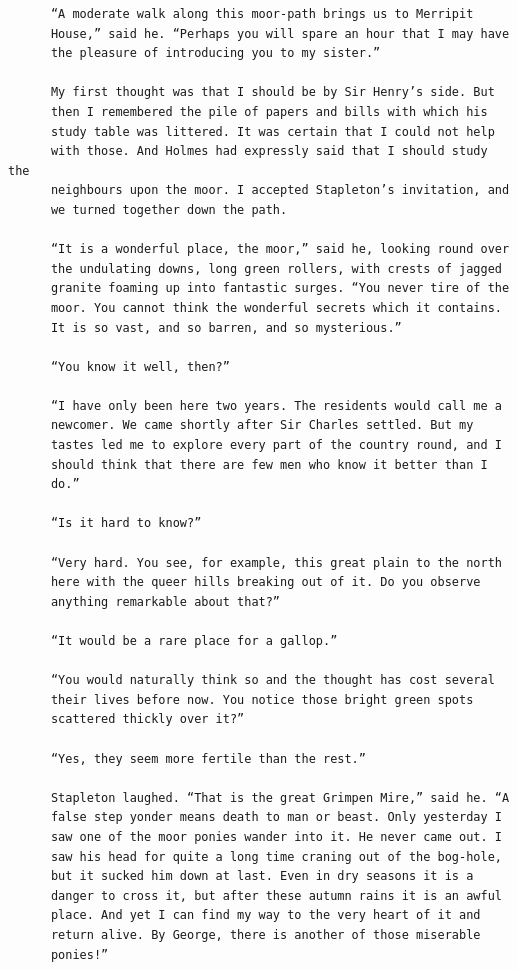 \documentclass{article}
\begin{document}
\begin{verbatim}
      “A moderate walk along this moor-path brings us to Merripit
      House,” said he. “Perhaps you will spare an hour that I may have
      the pleasure of introducing you to my sister.”

      My first thought was that I should be by Sir Henry’s side. But
      then I remembered the pile of papers and bills with which his
      study table was littered. It was certain that I could not help
      with those. And Holmes had expressly said that I should study the
      neighbours upon the moor. I accepted Stapleton’s invitation, and
      we turned together down the path.

      “It is a wonderful place, the moor,” said he, looking round over
      the undulating downs, long green rollers, with crests of jagged
      granite foaming up into fantastic surges. “You never tire of the
      moor. You cannot think the wonderful secrets which it contains.
      It is so vast, and so barren, and so mysterious.”

      “You know it well, then?”

      “I have only been here two years. The residents would call me a
      newcomer. We came shortly after Sir Charles settled. But my
      tastes led me to explore every part of the country round, and I
      should think that there are few men who know it better than I
      do.”

      “Is it hard to know?”

      “Very hard. You see, for example, this great plain to the north
      here with the queer hills breaking out of it. Do you observe
      anything remarkable about that?”

      “It would be a rare place for a gallop.”

      “You would naturally think so and the thought has cost several
      their lives before now. You notice those bright green spots
      scattered thickly over it?”

      “Yes, they seem more fertile than the rest.”

      Stapleton laughed. “That is the great Grimpen Mire,” said he. “A
      false step yonder means death to man or beast. Only yesterday I
      saw one of the moor ponies wander into it. He never came out. I
      saw his head for quite a long time craning out of the bog-hole,
      but it sucked him down at last. Even in dry seasons it is a
      danger to cross it, but after these autumn rains it is an awful
      place. And yet I can find my way to the very heart of it and
      return alive. By George, there is another of those miserable
      ponies!”


\end{verbatim}
\end{document}
